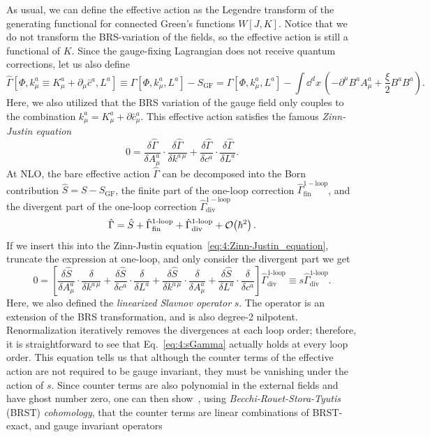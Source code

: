 As usual, we can define the effective action as the Legendre transform of the generating functional for connected Green's functions $W[J, K]$. Notice that we do not transform the BRS-variation of the fields, so the effective action is still a functional of $K$. Since the gauge-fixing Lagrangian does not receive quantum corrections, let us also define
\begin{equation}
\hat{\Gamma}[\Phi, k^a_\mu \equiv K^a_\mu + \partial_\mu \bar{c}^a, L^a] \equiv \Gamma[\Phi, k^a_\mu, L^a] - S_{\text{GF}} = \Gamma[\Phi, k^a_\mu, L^a] - \int \dd^d x\, \left(- \partial^\mu B^a A^a_\mu + \frac{\xi}{2} B^a B^a \right).
\end{equation}
Here, we also utilized that the BRS variation of the gauge field only couples to the combination $k_\mu^a = K_\mu^a + \partial \bar{c}_\mu^a$. This effective action satisfies the famous \textit{Zinn-Justin equation}~\cite{Zinn-Justin:1974ggz}
\begin{equation}
0 = \frac{\delta \hat{\Gamma}}{ \delta A^a_\mu} \cdot \frac{\delta \hat{\Gamma}}{\delta k^{a\, \mu}} + \frac{\delta \hat{\Gamma}}{\delta c^a} \cdot \frac{\delta \hat{\Gamma}}{\delta L^a}.
\label{eq:4:Zinn-Justin_equation}
\end{equation}
At \acs{NLO}, the bare effective action $\hat{\Gamma}$ can be decomposed into the Born contribution $\hat{S} = S - S_{\text{GF}}$, the finite part of the one-loop correction $\hat{\Gamma}^{1-\text{loop}}_\text{fin}$, and the divergent part of the one-loop correction $\hat{\Gamma}^{1-\text{loop}}_\text{div}$
\begin{equation}
\hat{\Gamma} = \hat{S} + \hat{\Gamma}^{1\text{-loop}}_\text{fin} + \hat{\Gamma}^{1\text{-loop}}_\text{div} + \mathcal{O}\!\left(\hbar^2\right).
\end{equation}
If we insert this into the Zinn-Justin equation~\eqref{eq:4:Zinn-Justin_equation}, truncate the expression at one-loop, and only consider the divergent part we get
\begin{equation}
0 = \left[\frac{\delta \hat{S}}{\delta A^a_\mu} \cdot \frac{\delta }{\delta k^{a\, \mu}} + \frac{\delta \hat{S}}{\delta c^a} \cdot \frac{\delta}{\delta L^a} + \frac{\delta \hat{S}}{\delta k^{a\, \mu}} \cdot \frac{\delta}{ \delta A^a_\mu} + \frac{\delta \hat{S}}{\delta L^a} \cdot \frac{\delta}{\delta c^a} \right] \hat{\Gamma}^{1\text{-loop}}_\text{div} \equiv s \hat{\Gamma}^{1\text{-loop}}_\text{div}.
\label{eq:4:sGamma}
\end{equation}
Here, we also defined the \textit{linearized Slavnov operator} $s$. The operator is an extension of the BRS transformation, and is also degree-2 nilpotent. Renormalization iteratively removes the divergences at each loop order; therefore, it is straightforward to see that Eq.~\eqref{eq:4:sGamma} actually holds at every loop order. This equation tells us that although the counter terms of the effective action are not required to be gauge invariant, they must be vanishing under the action of $s$. Since counter terms are also polynomial in the external fields and have ghost number zero, one can then show~\cite{Kluberg-Stern:1974iel, Joglekar:1975nu, Henneaux:2011rma}, using \textit{Becchi-Rouet-Stora-Tyutis} (BRST) \textit{cohomology}, that the counter terms are linear combinations of BRST-exact, and gauge invariant operators
